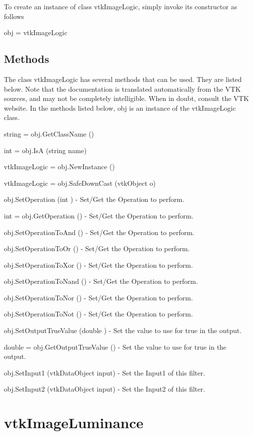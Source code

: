 To create an instance of class vtk\-Image\-Logic, simply invoke its constructor as follows \begin{DoxyVerb}  obj = vtkImageLogic
\end{DoxyVerb}
 \hypertarget{vtkwidgets_vtkxyplotwidget_Methods}{}\subsection{Methods}\label{vtkwidgets_vtkxyplotwidget_Methods}
The class vtk\-Image\-Logic has several methods that can be used. They are listed below. Note that the documentation is translated automatically from the V\-T\-K sources, and may not be completely intelligible. When in doubt, consult the V\-T\-K website. In the methods listed below, {\ttfamily obj} is an instance of the vtk\-Image\-Logic class. 
\begin{DoxyItemize}
\item {\ttfamily string = obj.\-Get\-Class\-Name ()}  
\item {\ttfamily int = obj.\-Is\-A (string name)}  
\item {\ttfamily vtk\-Image\-Logic = obj.\-New\-Instance ()}  
\item {\ttfamily vtk\-Image\-Logic = obj.\-Safe\-Down\-Cast (vtk\-Object o)}  
\item {\ttfamily obj.\-Set\-Operation (int )} -\/ Set/\-Get the Operation to perform.  
\item {\ttfamily int = obj.\-Get\-Operation ()} -\/ Set/\-Get the Operation to perform.  
\item {\ttfamily obj.\-Set\-Operation\-To\-And ()} -\/ Set/\-Get the Operation to perform.  
\item {\ttfamily obj.\-Set\-Operation\-To\-Or ()} -\/ Set/\-Get the Operation to perform.  
\item {\ttfamily obj.\-Set\-Operation\-To\-Xor ()} -\/ Set/\-Get the Operation to perform.  
\item {\ttfamily obj.\-Set\-Operation\-To\-Nand ()} -\/ Set/\-Get the Operation to perform.  
\item {\ttfamily obj.\-Set\-Operation\-To\-Nor ()} -\/ Set/\-Get the Operation to perform.  
\item {\ttfamily obj.\-Set\-Operation\-To\-Not ()} -\/ Set/\-Get the Operation to perform.  
\item {\ttfamily obj.\-Set\-Output\-True\-Value (double )} -\/ Set the value to use for true in the output.  
\item {\ttfamily double = obj.\-Get\-Output\-True\-Value ()} -\/ Set the value to use for true in the output.  
\item {\ttfamily obj.\-Set\-Input1 (vtk\-Data\-Object input)} -\/ Set the Input1 of this filter.  
\item {\ttfamily obj.\-Set\-Input2 (vtk\-Data\-Object input)} -\/ Set the Input2 of this filter.  
\end{DoxyItemize}\hypertarget{vtkimaging_vtkimageluminance}{}\section{vtk\-Image\-Luminance}\label{vtkimaging_vtkimageluminance}
